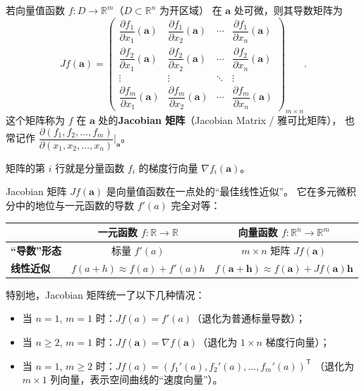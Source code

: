 \documentclass[lang=cn,11pt]{elegantbook}
\begin{document}
\begin{theorem} \label{thm:jacobian-formula}
若向量值函数 $f:D\to\mathbb R^m$（$D\subset\mathbb R^n$ 为开区域）
在 $\boldsymbol a$ 处可微，则其导数矩阵为
\[
\boxed{
Jf(\boldsymbol a)
=\begin{pmatrix}
\dfrac{\partial f_1}{\partial x_1}(\boldsymbol a) &
\dfrac{\partial f_1}{\partial x_2}(\boldsymbol a) &
\cdots &
\dfrac{\partial f_1}{\partial x_n}(\boldsymbol a) \\[10pt]
\dfrac{\partial f_2}{\partial x_1}(\boldsymbol a) &
\dfrac{\partial f_2}{\partial x_2}(\boldsymbol a) &
\cdots &
\dfrac{\partial f_2}{\partial x_n}(\boldsymbol a) \\[10pt]
\vdots & \vdots & \ddots & \vdots \\[8pt]
\dfrac{\partial f_m}{\partial x_1}(\boldsymbol a) &
\dfrac{\partial f_m}{\partial x_2}(\boldsymbol a) &
\cdots &
\dfrac{\partial f_m}{\partial x_n}(\boldsymbol a)
\end{pmatrix}_{m\times n}
}.
\]
这个矩阵称为 $f$ 在 $\boldsymbol a$ 处的\textbf{Jacobian 矩阵}（Jacobian Matrix / 雅可比矩阵），
也常记作 $\dfrac{\partial(f_1,f_2,\dots,f_m)}{\partial(x_1,x_2,\dots,x_n)}\biggr|_{\boldsymbol a}$。

矩阵的第 $i$ 行就是分量函数 $f_i$ 的梯度行向量 $\nabla f_i(\boldsymbol a)$。
\end{theorem}

\begin{remark}
Jacobian 矩阵 $Jf(\boldsymbol a)$ 是向量值函数在一点处的“最佳线性近似”。
它在多元微积分中的地位与一元函数的导数 $f'(a)$ 完全对等：
\begin{center}
\begin{tabular}{@{}lcc@{}}
\hline
& \textbf{一元函数} $f:\mathbb R\to\mathbb R$ & \textbf{向量函数} $f:\mathbb R^n\to\mathbb R^m$ \\
\hline
\textbf{“导数”形态} & 标量 $f'(a)$ & $m \times n$ 矩阵 $Jf(\boldsymbol a)$ \\
\textbf{线性近似} & $f(a+h)\approx f(a)+f'(a)h$ & $f(\boldsymbol a+\boldsymbol h)\approx f(\boldsymbol a)+Jf(\boldsymbol a)\boldsymbol h$ \\
\hline
\end{tabular}
\end{center}
特别地，Jacobian 矩阵统一了以下几种情况：
\begin{itemize}
  \item 当 $n=1$, $m=1$ 时：$Jf(a)=f'(a)$（退化为普通标量导数）；
  \item 当 $n\geq 2$, $m=1$ 时：$Jf(\boldsymbol a)= \nabla f(\boldsymbol a)$（退化为 $1 \times n$ 梯度行向量）；
  \item 当 $n=1$, $m\geq 2$ 时：$Jf(a)=(f_1'(a),f_2'(a),\dots,f_m'(a))^{\mathsf T}$
        （退化为 $m \times 1$ 列向量，表示空间曲线的“速度向量”）。
\end{itemize}
\end{remark}
\end{document}
